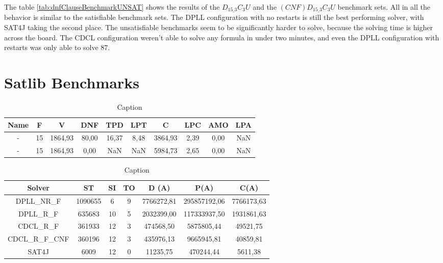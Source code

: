 The table \ref{tab:dnfClauseBenchmarkUNSAT} shows the results of the $D_{15\_3}C_3U$ and the $(CNF)D_{15\_3}C_3U$ benchmark sets. All in all the behavior is similar to the satisfiable benchmark sets. The DPLL configuration with no restarts is still the best performing solver, with SAT4J taking the second place. The unsatisfiable benchmarks seem to be significantly harder to solve, because the solving time is higher across the board. The CDCL configuration weren't able to solve any formula in under two minutes, and even the DPLL configuration with restarts was only able to solve 87.

\section{Satlib Benchmarks}

\begin{table}[htb]
\centering
\caption{Caption}
\label{tab:example}
\begin{tabular}{|c|c|c|c|c|c|c|c|c|c|}
\hline
Name & F & V & DNF & TPD & LPT & C & LPC & AMO & LPA \\
\hline
- & 15 & 1864,93 & 80,00 & 16,37 & 8,48 & 3864,93 & 2,39 & 0,00 & NaN \\ 
 \hline 
- & 15 & 1864,93 & 0,00 & NaN & NaN & 5984,73 & 2,65 & 0,00 & NaN \\ 
 \hline 
\end{tabular}
\end{table}


\begin{table}[htb]
\centering
\caption{Caption}
\label{tab:example}
\begin{tabular}{|c|c|c|c|c|c|c|}
\hline
Solver & ST & SI & TO & D (A) & P(A) & C(A)\\
\hline
DPLL\_NR\_F & 1090655 & 6 & 9 & 7766272,81 & 295857192,06 & 7766173,63 \\
\hline
DPLL\_R\_F & 635683 & 10 & 5 & 2032399,00 & 117333937,50 & 1931861,63 \\
\hline
CDCL\_R\_F & 361933 & 12 & 3 & 474568,50 & 5875805,44 & 49521,75 \\
\hline
CDCL\_R\_F\_CNF & 360196 & 12 & 3 & 435976,13 & 9665945,81 & 40859,81 \\
\hline
SAT4J & 6009 & 12 & 0 & 11235,75 & 470244,44 & 5611,38 \\
\hline
\end{tabular}
\end{table}